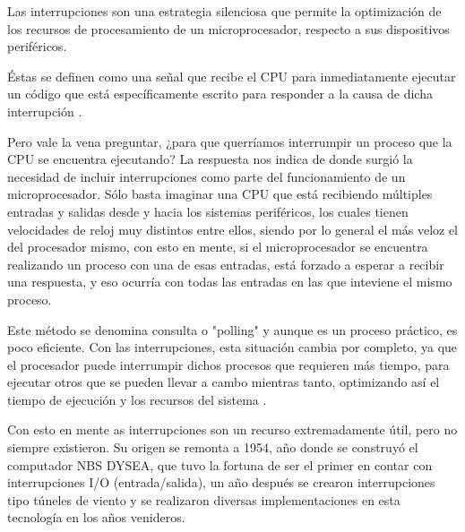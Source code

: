 \documentclass[12pt,a4paper]{report}
\begin{document}
    \vspace{1cm}
       Las interrupciones son una estrategia silenciosa que permite la optimización de los recursos de procesamiento de un microprocesador, respecto a sus dispositivos periféricos.
   
   \vspace{1cm}
   
       Éstas se definen como una señal que recibe el CPU para inmediatamente ejecutar un código que está específicamente escrito para responder a la causa de dicha interrupción \cite{Mike Silva 2013}.
   
   \vspace{1cm}
   
       Pero vale la vena preguntar, ¿para que querríamos interrumpir un proceso que la CPU se encuentra ejecutando? La respuesta nos indica de donde surgió la necesidad de incluir interrupciones como parte del funcionamiento de un microprocesador. Sólo basta imaginar una CPU que está recibiendo múltiples entradas y salidas desde y hacia los sistemas periféricos, los cuales tienen velocidades de reloj muy distintos entre ellos, siendo por lo general el más veloz el del procesador mismo, con esto en mente, si el microprocesador se encuentra realizando un proceso con una de esas entradas, está forzado a esperar a recibir una respuesta, y eso ocurría con todas las entradas en las que inteviene el mismo proceso. 
       
   \vspace{1cm}
       
       Este método se denomina consulta o "polling" y aunque es un proceso práctico, es poco eficiente. Con las interrupciones, esta situación cambia por completo, ya que el procesador puede interrumpir dichos procesos que requieren más tiempo, para ejecutar otros que se pueden llevar a cambo mientras tanto, optimizando así el tiempo de ejecución y los recursos del sistema \cite{Mike Silva 2013}.
       
       
   \vspace{1cm}
   
      Con esto en mente as interrupciones son un recurso extremadamente útil, pero no siempre existieron. Su origen se remonta a 1954, año donde se construyó el computador NBS DYSEA, que tuvo la fortuna de ser el primer en contar con interrupciones I/O (entrada/salida), un año después se crearon interrupciones tipo túneles de viento y se realizaron diversas implementaciones en esta tecnología en los años venideros. 
      
\end{document}
